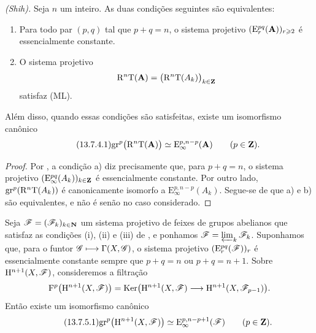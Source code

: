 \begin{proposition}[13.7.4]
\label{0.13.7.4}
\emph{(Shih).}
Seja $n$ um inteiro.
As duas condições seguintes são equivalentes:
\begin{enumerate}
  \item[{\rm a)}] Para todo par $(p,q)$ tal que $p+q=n$, o
  sistema projetivo
  $(\mathrm{E}_r^{pq}(\mathbf{A}))_{r\geqslant2}$ é essencialmente constante.
  \item[{\rm b)}] O sistema projetivo
  \[
    \mathrm{R}^n\mathrm{T}(\mathbf{A})
    =
    \bigl(\mathrm{R}^n\mathrm{T}(A_k)\bigr)_{k\in\mathbf{Z}}
  \]
  satisfaz {\rm(ML)}.
\end{enumerate}
Além disso, quando essas condições são satisfeitas, existe um
isomorfismo canônico
\begin{equation}
\label{0.13.7.4.1}
\tag{13.7.4.1}
  \mathrm{gr}^p\bigl(\RR^n\mathrm{T}(\bb{A})\bigr)
  \isoto
  \mathrm{E}_\infty^{p,n-p}(\bb{A})
  \qquad(p\in\bb{Z}).
\end{equation}
\end{proposition}

\begin{proof}
Por , a condição {\rm a)} diz precisamente que, para
$p+q=n$, o sistema projetivo
$(\mathrm{E}_\infty^{pq}(A_k))_{k\in\mathbf{Z}}$ é essencialmente
constante.
Por outro lado,
$\mathrm{gr}^p(\mathrm{R}^n\mathrm{T}(A_k))$ é canonicamente isomorfo a
$\mathrm{E}_\infty^{p,n-p}(A_k)$.
Segue-se de  que {\rm a)} e {\rm b)} são
equivalentes, e  não é senão
 no caso considerado.
\end{proof}

\begin{corollary}[13.7.5]
\label{0.13.7.5}
Seja $\mathscr{F}=(\mathscr{F}_k)_{k\in\mathbf{N}}$ um sistema projetivo de
feixes de grupos abelianos que satisfaz as condições {\rm(i)}, {\rm(ii)}
e {\rm(iii)} de , e ponhamos
$\mathscr{F}=\varprojlim_k\mathscr{F}_k$.
Suponhamos que, para o funtor
$\mathscr{G}\longmapsto\Gamma(X,\mathscr{G})$, o sistema projetivo
$(\mathrm{E}_r^{pq}(\mathscr{F}))_r$ é essencialmente constante sempre que
$p+q=n$ ou $p+q=n+1$.
Sobre $\mathrm{H}^{n+1}(X,\mathscr{F})$, consideremos a filtração
\[
  \mathrm{F}^p\bigl(\mathrm{H}^{n+1}(X,\mathscr{F})\bigr)
  =
  \operatorname{Ker}\bigl(
    \mathrm{H}^{n+1}(X,\mathscr{F})
    \longrightarrow
    \mathrm{H}^{n+1}(X,\mathscr{F}_{p-1})
  \bigr).
\]
Então existe um isomorfismo canônico
\begin{equation}
\label{0.13.7.5.1}
\tag{13.7.5.1}
  \mathrm{gr}^p\bigl(\HH^{n+1}(X,\sh{F})\bigr)
  \isoto
  \mathrm{E}_\infty^{p,n-p+1}(\sh{F})
  \qquad(p\in\bb{Z}).
\end{equation}
\end{corollary}

